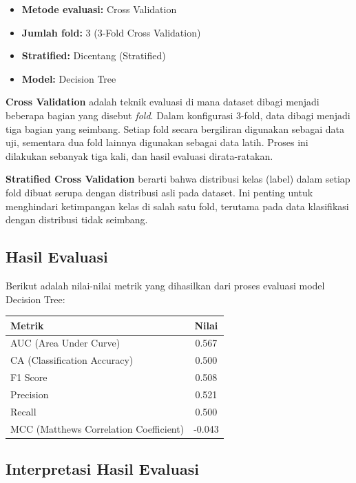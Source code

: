 \begin{itemize}
	\item \textbf{Metode evaluasi:} Cross Validation
	\item \textbf{Jumlah fold:} 3 (3-Fold Cross Validation)
	\item \textbf{Stratified:} Dicentang (Stratified)
	\item \textbf{Model:} Decision Tree
\end{itemize}

\textbf{Cross Validation} adalah teknik evaluasi di mana dataset dibagi menjadi beberapa bagian yang disebut \textit{fold}. Dalam konfigurasi 3-fold, data dibagi menjadi tiga bagian yang seimbang. Setiap fold secara bergiliran digunakan sebagai data uji, sementara dua fold lainnya digunakan sebagai data latih. Proses ini dilakukan sebanyak tiga kali, dan hasil evaluasi dirata-ratakan.

\textbf{Stratified Cross Validation} berarti bahwa distribusi kelas (label) dalam setiap fold dibuat serupa dengan distribusi asli pada dataset. Ini penting untuk menghindari ketimpangan kelas di salah satu fold, terutama pada data klasifikasi dengan distribusi tidak seimbang.

\subsection*{Hasil Evaluasi}

Berikut adalah nilai-nilai metrik yang dihasilkan dari proses evaluasi model Decision Tree:

\begin{center}
	\begin{tabular}{|l|c|}
		\hline
		\textbf{Metrik} & \textbf{Nilai} \\
		\hline
		AUC (Area Under Curve) & 0.567 \\
		CA (Classification Accuracy) & 0.500 \\
		F1 Score & 0.508 \\
		Precision & 0.521 \\
		Recall & 0.500 \\
		MCC (Matthews Correlation Coefficient) & -0.043 \\
		\hline
	\end{tabular}
\end{center}

\subsection*{Interpretasi Hasil Evaluasi}

